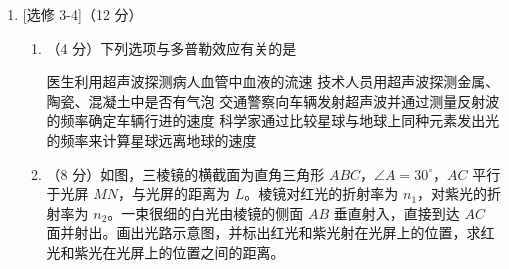 \documentclass[\gkver]{gaokaozhenti}
\begin{document}
\begin{enumerate}
\begin{enumerate}
\end{enumerate}


\item
[选修 3-4]（12 分）

\begin{enumerate}
	\item
	（4 分）下列选项与多普勒效应有关的是

	{医生利用超声波探测病人血管中血液的流速}
	{技术人员用超声波探测金属、陶瓷、混凝土中是否有气泡}
	{交通警察向车辆发射超声波并通过测量反射波的频率确定车辆行进的速度}
	{科学家通过比较星球与地球上同种元素发出光的频率来计算星球远离地球的速度}

	\item
	（8 分）如图，三棱镜的横截面为直角三角形 $ABC$，$\angle A=30^\circ$，$AC$ 平行于光屏 $MN$，与光屏的距离为 $L$。棱镜对红光的折射率为 $n_1$，对紫光的折射率为 $n_2$。一束很细的白光由棱镜的侧面 $AB$ 垂直射入，直接到达 $AC$ 面并射出。画出光路示意图，并标出红光和紫光射在光屏上的位置，求红光和紫光在光屏上的位置之间的距离。

\end{enumerate}


\end{enumerate}
\end{document}
